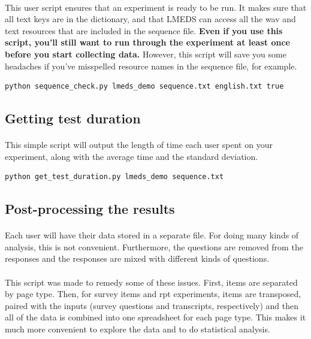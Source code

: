 \documentclass[12pt, oneside]{scrbook}   	%
\begin{document}
\paragraph{}
This user script ensures that an experiment is ready to be run.  It makes sure that all text keys are in the dictionary, and that LMEDS can access all the wav and text resources that are included in the sequence file.  \textbf{Even if you use this script, you'll still want to run through the experiment at least once before you start collecting data.}  However, this script will save you some headaches if you've misspelled resource names in the sequence file, for example.

\begin{lstlisting}
python sequence_check.py lmeds_demo sequence.txt english.txt true
\end{lstlisting}

\subsection{Getting test duration}

\paragraph{}
This simple script will output the length of time each user spent on your experiment, along with the average time and the standard deviation.

\begin{lstlisting}
python get_test_duration.py lmeds_demo sequence.txt
\end{lstlisting}

\subsection{Post-processing the results}

\paragraph{}
Each user will have their data stored in a separate file.  For doing many kinds of analysis, this is not convenient.  Furthermore, the questions are removed from the responses and the responses are mixed with different kinds of questions.

\paragraph{}
This script was made to remedy some of these issues.  First, items are separated by page type.  Then, for survey items and rpt experiments, items are transposed, paired with the inputs (survey questions and transcripts, respectively) and then all of the data is combined into one spreadsheet for each page type.  This makes it much more convenient to explore the data and to do statistical analysis.
\end{document}

